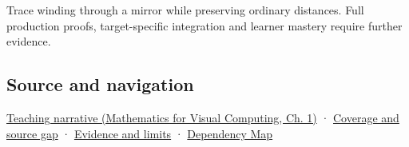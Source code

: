 Trace winding through a mirror while preserving ordinary distances. Full production proofs, target-specific integration and learner mastery require further evidence.

\subsection{Source and navigation}\label{appendix-87d7626c8d37-source-and-navigation}

\href{../02-Mathematics-for-Visual-Computing/main.pdf\#nameddest=01-foundations-i-ch017-oriented-area-tells-us-which-side-of-the-panel-is-front}{Teaching narrative (Mathematics for Visual Computing, Ch. 1)} · \hyperref[appendix-fd090d982a15-phase-6---parts-501-600]{Coverage and source gap} · \hyperref[appendix-a103e7846d21-phase-6---source-analysis-and-verification]{Evidence and limits} · \hyperref[appendix-4ad47bdd269a]{Dependency Map}

